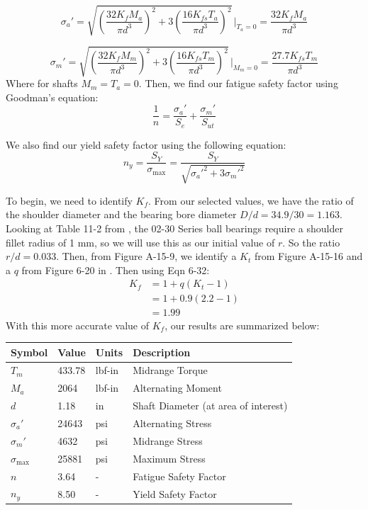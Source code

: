 \documentclass[letterpaper,12pt]{article}
\begin{document}
\begin{equation*}
    \sigma_a' = \sqrt{\left(\frac{32K_f M_a}{\pi d^3}\right)^2 + 3\left(\frac{16K_{fs} T_a}{\pi d^3}\right)^2}\, \bigg\rvert_{T_a = 0} = \frac{32K_f M_a}{\pi d^3}
\end{equation*}

\begin{equation*}
    \sigma_m' = \sqrt{\left(\frac{32K_f M_m}{\pi d^3}\right)^2 + 3\left(\frac{16K_{fs} T_m}{\pi d^3}\right)^2}\, \bigg\rvert_{M_m = 0} = \frac{27.7 K_{fs} T_m}{\pi d^3}
\end{equation*}
Where for shafts $M_m = T_a = 0$. Then, we find our fatigue safety factor using Goodman's equation:
\begin{equation*}
    \frac{1}{n} = \frac{\sigma_a'}{S_e} + \frac{\sigma_m'}{S_{ut}}
\end{equation*}

\noindent We also find our yield safety factor using the following equation:
\begin{equation*}
    n_y = \frac{S_Y}{\sigma_{\text{max}}} = \frac{S_Y}{\sqrt{\sigma_a'^2 + 3\sigma_m'^2}}
\end{equation*}

\noindent To begin, we need to identify $K_f$. From our selected values, we have the ratio of the shoulder diameter and the bearing bore diameter $D/d = 34.9/30 = 1.163$. Looking at Table 11-2 from \cite{shigley}, the 02-30 Series ball bearings require a shoulder fillet radius of 1 mm, so we will use this as our initial value of $r$. So the ratio $r/d = 0.033$. Then, from Figure A-15-9, we identify a $K_t$ from Figure A-15-16 and a $q$ from Figure 6-20 in \cite{shigley}. Then using Eqn 6-32:
\begin{align*}
    K_f &= 1 + q(K_t - 1)\\
    &= 1 + 0.9(2.2 - 1)\\
    &= 1.99
\end{align*}
With this more accurate value of $K_f$, our results are summarized below:

\begin{center}
	\begin{tabular}{ |p{1.5cm}||p{1.2cm}|p{2cm}|p{7cm}|  }
		\hline
		Symbol & Value & Units & Description\\
		\hline
		$T_m$ & 433.78 & lbf-in & Midrange Torque\\
        $M_a$ & 2064 & lbf-in  & Alternating Moment\\			
		$d$ & 1.18 & in  & Shaft Diameter (at area of interest)\\
		\hline
		\hline
		$\sigma_a'$ & 24643 & psi & Alternating Stress\\
		$\sigma_m'$ & 4632 & psi & Midrange Stress\\
		$\sigma_{\text{max}}$ & 25881 & psi & Maximum Stress\\
		\hline
		\hline
		$n$ & 3.64 & - & Fatigue Safety Factor\\
		$n_y$ & 8.50 & - & Yield Safety Factor\\
		\hline
	\end{tabular}
\end{center}
\end{document}
